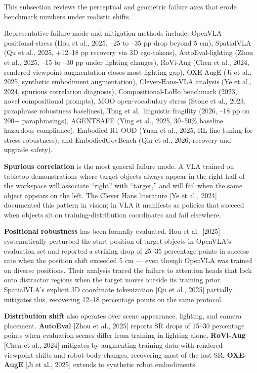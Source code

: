 This subsection reviews the perceptual and geometric failure axes that erode benchmark numbers under realistic shifts.

Representative failure-mode and mitigation methods include: OpenVLA-positional-stress (Hou et al., 2025, --25 to --35 pp drop beyond 5 cm), SpatialVLA (Qu et al., 2025, +12--18 pp recovery via 3D ego-tokens), AutoEval-lighting (Zhou et al., 2025, --15 to --30 pp under lighting changes), RoVi-Aug (Chen et al., 2024, rendered viewpoint augmentation closes most lighting gap), OXE-AugE (Ji et al., 2025, synthetic embodiment augmentation), Clever-Hans-VLA analysis (Ye et al., 2024, spurious correlation diagnosis), Compositional-LoHo benchmark (2023, novel compositional prompts), MOO open-vocabulary stress (Stone et al., 2023, paraphrase robustness baselines), Tong et al.~linguistic fragility (2026, --18 pp on 200+ paraphrasings), AGENTSAFE (Ying et al., 2025, 30--50\% baseline hazardous compliance), Embodied-R1-OOD (Yuan et al., 2025, RL fine-tuning for stress robustness), and EmbodiedGovBench (Qin et al., 2026, recovery and upgrade safety).

\textbf{Spurious correlation} is the most general failure mode. A VLA trained on tabletop demonstrations where target objects always appear in the right half of the workspace will associate ``right'' with ``target,'' and will fail when the same object appears on the left. The Clever Hans literature {[}Ye et al., 2024{]} documented this pattern in vision; in VLA it manifests as policies that succeed when objects sit on training-distribution coordinates and fail elsewhere.

\textbf{Positional robustness} has been formally evaluated. Hou et al.~{[}2025{]} systematically perturbed the start position of target objects in OpenVLA's evaluation set and reported a striking drop of 25--35 percentage points in success rate when the position shift exceeded 5 cm --- even though OpenVLA was trained on diverse positions. Their analysis traced the failure to attention heads that lock onto distractor regions when the target moves outside its training prior. SpatialVLA's explicit 3D coordinate tokenization {[}Qu et al., 2025{]} partially mitigates this, recovering 12--18 percentage points on the same protocol.

\textbf{Distribution shift} also operates over scene appearance, lighting, and camera placement. \textbf{AutoEval} {[}Zhou et al., 2025{]} reports SR drops of 15--30 percentage points when evaluation scenes differ from training in lighting alone. \textbf{RoVi-Aug} {[}Chen et al., 2024{]} mitigates by augmenting training data with rendered viewpoint shifts and robot-body changes, recovering most of the lost SR. \textbf{OXE-AugE} {[}Ji et al., 2025{]} extends to synthetic robot embodiments.

